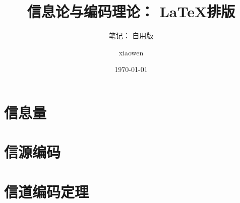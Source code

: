 \documentclass[lang=cn,12pt]{elegantbook}
\title{信息论与编码理论： \LaTeX{}排版 }
\subtitle{笔记： 自用版}
\author{xiaowen}
\date{\today}
\numberwithin{equation}{section}
\begin{document}
\maketitle
\frontmatter
\tableofcontents
\mainmatter

\chapter{信息量}








%
\chapter{信源编码}






\chapter{信道编码定理}









\end{document}

